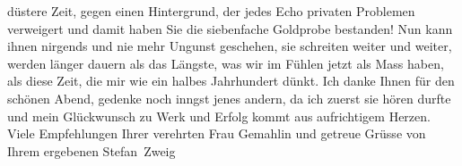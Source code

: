                düstere Zeit, gegen einen Hintergrund, der jedes Echo privaten Problemen verweigert
               und damit \introOben{}haben Sie\introOben{} die siebenfache Goldprobe {\pb}bestanden! Nun
               kann ihnen nirgends und nie mehr Ungunst geschehen, sie schreiten weiter und weiter,
               werden länger dauern als das Längste, was wir im Fühlen jetzt als Mass haben, als
               diese Zeit, die mir wie ein halbes Jahrhundert dünkt. Ich danke Ihnen für den schönen
               Abend, gedenke noch inngst jenes andern, da ich zuerst sie hören durfte und mein
               Glückwunsch zu Werk und Erfolg kommt aus aufrichtigem Herzen. Viele Empfehlungen
               Ihrer verehrten Frau Gemahlin
               und getreue Grüsse von Ihrem ergebenen\pend
           \pstart \spacefill\mbox{Stefan Zweig}\pend{}\endnumbering{}
\begin{anhang}
\end{anhang}
      